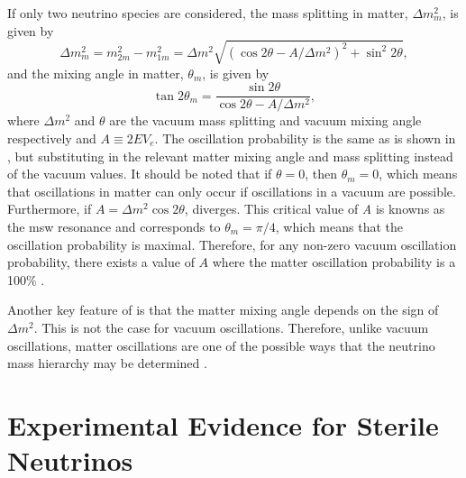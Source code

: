 If only two neutrino species are considered, the mass splitting in matter, $\Delta m^2_m$, is given by 
\begin{equation}
    \Delta m_m^2 = m_{2m}^2 - m_{1m}^2 = \Delta m^2 \sqrt{(\cos{2\theta} - A/\Delta m^2)^2 + \sin^2{2\theta}},
\end{equation}
and the mixing angle in matter, $\theta_m$, is given by
\begin{equation}
    \tan{2\theta_m} = \frac{\sin{2\theta}}{\cos{2\theta} - A/\Delta m^2},
    \label{eqn:matter_mixing_angle}
\end{equation}
where $\Delta m^2$ and $\theta$ are the vacuum mass splitting and vacuum mixing angle respectively and $A \equiv 2EV_e$. The oscillation probability is the same as is shown in , but substituting in the relevant matter mixing angle and mass splitting instead of the vacuum values. It should be noted that if $\theta = 0$, then $\theta_m = 0$, which means that oscillations in matter can only occur if oscillations in a vacuum are possible. Furthermore, if $A = \Delta m^2\cos{2\theta}$,  diverges. This critical value of \textit{A} is knowns as the \gls{msw} resonance and corresponds to $\theta_m = \pi/4$, which means that the oscillation probability is maximal. Therefore, for any non-zero vacuum oscillation probability, there exists a value of $A$ where the matter oscillation probability is a 100\% \cite{PDG_2022}. 

Another key feature of  is that the matter mixing angle depends on the sign of $\Delta m^2$. This is not the case for vacuum oscillations. Therefore, unlike vacuum oscillations, matter oscillations are one of the possible ways that the neutrino mass hierarchy may be determined \cite{mass_hierarchy_discussion}. 

\newpage
\section{Experimental Evidence for Sterile Neutrinos}\label{subchap:Motivation for Sterile Neutrinos}

